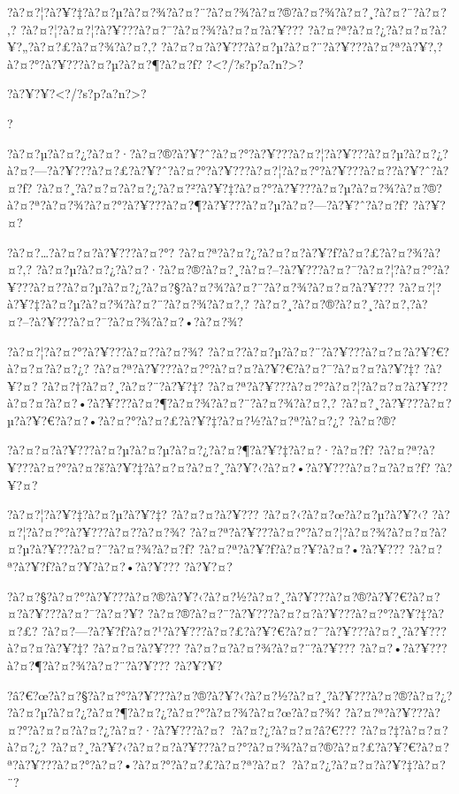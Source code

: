 \documentclass[11pt, openany]{book}
\begin{document}
{{{{{{{?à?¤?¦?à?¥?‡?à?¤?µ?à?¤?¾?à?¤?¨?à?¤?¾?à?¤?®?à?¤?¾?à?¤?¸?à?¤?¨?à?¤?‚?
?à?¤?¦?à?¤?¦?à?¥???à?¤?¯?à?¤?¾?à?¤?¤?à?¥???
?à?¤?ª?à?¤?¿?à?¤?¤?à?¥?„?à?¤?£?à?¤?¾?à?¤?‚?
?à?¤?¤?à?¥???à?¤?µ?à?¤?¨?à?¥???à?¤?ª?à?¥?‚?à?¤?°?à?¥???à?¤?µ?à?¤?¶?à?¤?ƒ?
?\textless{}?/?s?p?a?n?\textgreater{}?

?à?¥?¥?\textless{}?/?s?p?a?n?\textgreater{}?

?

?à?¤?µ?à?¤?¿?à?¤?·?à?¤?®?à?¥?ˆ?à?¤?°?à?¥???à?¤?¦?à?¥???à?¤?µ?à?¤?¿?à?¤?---?à?¥???à?¤?£?à?¥?ˆ?à?¤?°?à?¥???à?¤?¦?à?¤?°?à?¥???à?¤?­?à?¥?ˆ?à?¤?ƒ?
?à?¤?¸?à?¤?¤?à?¤?¿?à?¤?²?à?¥?‡?à?¤?°?à?¥???à?¤?µ?à?¤?¾?à?¤?®?à?¤?ª?à?¤?¾?à?¤?°?à?¥???à?¤?¶?à?¥???à?¤?µ?à?¤?---?à?¥?ˆ?à?¤?ƒ?
?à?¥?¤?

?à?¤?\ldots{}?à?¤?¤?à?¥???à?¤?°?
?à?¤?ª?à?¤?¿?à?¤?¤?à?¥?ƒ?à?¤?£?à?¤?¾?à?¤?‚?
?à?¤?µ?à?¤?¿?à?¤?·?à?¤?®?à?¤?¸?à?¤?--?à?¥???à?¤?¯?à?¤?¦?à?¤?°?à?¥???à?¤?­?à?¤?µ?à?¤?¿?à?¤?§?à?¤?¾?à?¤?¨?à?¤?¾?à?¤?¤?à?¥???
?à?¤?¦?à?¥?‡?à?¤?µ?à?¤?¾?à?¤?¨?à?¤?¾?à?¤?‚?
?à?¤?¸?à?¤?®?à?¤?¸?à?¤?‚?à?¤?--?à?¥???à?¤?¯?à?¤?¾?à?¤?•?à?¤?¾?

?à?¤?¦?à?¤?°?à?¥???à?¤?­?à?¤?¾?
?à?¤?­?à?¤?µ?à?¤?¨?à?¥???à?¤?¤?à?¥?€?à?¤?¤?à?¤?¿?
?à?¤?ª?à?¥???à?¤?°?à?¤?¤?à?¥?€?à?¤?¯?à?¤?¤?à?¥?‡? ?à?¥?¤?
?à?¤?†?à?¤?¸?à?¤?¨?à?¥?‡?
?à?¤?ª?à?¥???à?¤?°?à?¤?¦?à?¤?¤?à?¥???à?¤?¤?à?¤?•?à?¥???à?¤?¶?à?¤?¾?à?¤?¨?à?¤?¾?à?¤?‚?
?à?¤?¸?à?¥???à?¤?µ?à?¥?€?à?¤?•?à?¤?°?à?¤?£?à?¥?‡?à?¤?½?à?¤?ª?à?¤?¿?
?à?¤?®?

?à?¤?¤?à?¥???à?¤?µ?à?¤?µ?à?¤?¿?à?¤?¶?à?¥?‡?à?¤?·?à?¤?ƒ?
?à?¤?ª?à?¥???à?¤?°?à?¤?š?à?¥?‡?à?¤?¤?à?¤?¸?à?¥?‹?à?¤?•?à?¥???à?¤?¤?à?¤?ƒ?
?à?¥?¤?

?à?¤?¦?à?¥?‡?à?¤?µ?à?¥?‡? ?à?¤?¤?à?¥??? ?à?¤?‹?à?¤?œ?à?¤?µ?à?¥?‹?
?à?¤?¦?à?¤?°?à?¥???à?¤?­?à?¤?¾?
?à?¤?ª?à?¥???à?¤?°?à?¤?¦?à?¤?¾?à?¤?¤?à?¤?µ?à?¥???à?¤?¯?à?¤?¾?à?¤?ƒ?
?à?¤?ª?à?¥?ƒ?à?¤?¥?à?¤?•?à?¥??? ?à?¤?ª?à?¥?ƒ?à?¤?¥?à?¤?•?à?¥??? ?à?¥?¤?

?à?¤?§?à?¤?°?à?¥???à?¤?®?à?¥?‹?à?¤?½?à?¤?¸?à?¥???à?¤?®?à?¥?€?à?¤?¤?à?¥???à?¤?¯?à?¤?¥?
?à?¤?®?à?¤?¨?à?¥???à?¤?¤?à?¥???à?¤?°?à?¥?‡?à?¤?£?
?à?¤?---?à?¥?ƒ?à?¤?¹?à?¥???à?¤?£?à?¥?€?à?¤?¯?à?¥???à?¤?¸?à?¥???à?¤?¤?à?¥?‡?
?à?¤?¤?à?¥??? ?à?¤?¤?à?¤?¾?à?¤?¨?à?¥???
?à?¤?•?à?¥???à?¤?¶?à?¤?¾?à?¤?¨?à?¥??? ?à?¥?¥?

?â?€?œ?à?¤?§?à?¤?°?à?¥???à?¤?®?à?¥?‹?à?¤?½?à?¤?¸?à?¥???à?¤?®?à?¤?¿?
?à?¤?µ?à?¤?¿?à?¤?¶?à?¤?¿?à?¤?°?à?¤?¾?à?¤?œ?à?¤?¾?
?à?¤?ª?à?¥???à?¤?°?à?¤?¤?à?¤?¿?à?¤?·?à?¥???à?¤?~?à?¤?¿?à?¤?¤?â?€???
?à?¤?‡?à?¤?¤?à?¤?¿?
?à?¤?¸?à?¥?‹?à?¤?¤?à?¥???à?¤?°?à?¤?¾?à?¤?®?à?¤?£?à?¥?€?à?¤?ª?à?¥???à?¤?°?à?¤?•?à?¤?°?à?¤?£?à?¤?ª?à?¤?~?à?¤?¿?à?¤?¤?à?¥?‡?à?¤?¨?

}}}}}}}
\end{document}
